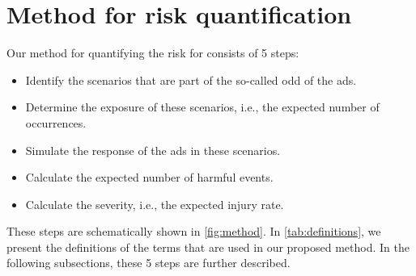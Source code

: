 \section{Method for risk quantification}
\label{sec:method}

Our method for quantifying the risk for  consists of 5 steps:
\begin{itemize}
	\item Identify the scenarios that are part of the so-called \ac{odd} of the \ac{ads}.
	\item Determine the exposure of these scenarios, i.e., the expected number of occurrences.
	\item Simulate the response of the \ac{ads} in these scenarios.
	\item Calculate the expected number of harmful events.
	\item Calculate the severity, i.e., the expected injury rate.
\end{itemize}
These steps are schematically shown in \cref{fig:method}. 
In \cref{tab:definitions}, we present the definitions of the terms that are used in our proposed method.
In the following subsections, these 5 steps are further described.

\begin{figure*}
	\centering
	
	\caption{Schematic overview of the risk quantification method presented in this article. 
		Each of the 5 steps is further explained in \cref{sec:scenario identification,sec:exposure,sec:simulation,sec:harmful,sec:severity}, respectively.}
	\label{fig:method}
\end{figure*}

